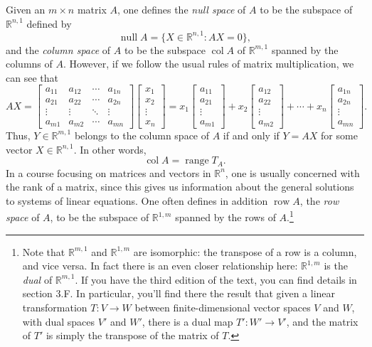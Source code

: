 \documentclass[letterpaper,12pt]{article}
\newcommand{\R}{\mathbb{R}}
\DeclareMathOperator{\nul}{null}
\DeclareMathOperator{\range}{range}
\DeclareMathOperator{\col}{col}
\DeclareMathOperator{\row}{row}
\begin{document}
Given an $m\times n$ matrix $A$, one defines the {\em null space} of $A$ to be the subspace of $\R^{n,1}$ defined by
\[
 \nul A = \{X\in\R^{n,1} : AX=0\},
\]
and the {\em column space} of $A$ to be the subspace $\col A$ of $\R^{m,1}$ spanned by the columns of $A$. However, if we follow the usual rules of matrix multiplication, we can see that
\[
 AX = \begin{bmatrix}a_{11}&a_{12}&\cdots & a_{1n}\\
                a_{21}&a_{22}&\cdots&a_{2n}\\
		\vdots & \vdots & \ddots & \vdots\\
		a_{m1} & a_{m2} & \cdots & a_{mn}
               \end{bmatrix}\begin{bmatrix}x_1\\x_2\\\vdots\\x_n\end{bmatrix}
=x_1\begin{bmatrix}a_{11}\\a_{21}\\\vdots\\a_{m1}\end{bmatrix}+x_2\begin{bmatrix}a_{12}\\a_{22}\\\vdots\\a_{m2}\end{bmatrix}+\cdots +x_n\begin{bmatrix}a_{1n}\\a_{2n}\\\vdots\\a_{mn}\end{bmatrix}.
\]
Thus, $Y\in\R^{m,1}$ belongs to the column space of $A$ if and only if $Y=AX$ for some vector $X\in\R^{n,1}$. In other words,
\[
 \col A = \range T_A.
\]
In a course focusing on matrices and vectors in $\R^n$, one is usually concerned with the rank of a matrix, since this gives us information about the general solutions to systems of linear equations. One often defines in addition $\row A$, the {\em row space} of $A$, to be the subspace of $\R^{1,m}$ spanned by the rows of $A$.\footnote{Note that $\R^{m,1}$ and $\R^{1,m}$ are isomorphic: the transpose of a row is a column, and vice versa. In fact there is an even closer relationship here: $\R^{1,m}$ is the {\em dual} of $\R^{m,1}$. If you have the third edition of the text, you can find details in section 3.F. In  particular, you'll find there the result that given a linear transformation $T:V\to W$ between finite-dimensional vector spaces $V$ and $W$, with dual spaces $V'$ and $W'$, there is a dual map $T':W'\to V'$, and the matrix of $T'$ is simply the transpose of the matrix of $T$.}
\end{document}
